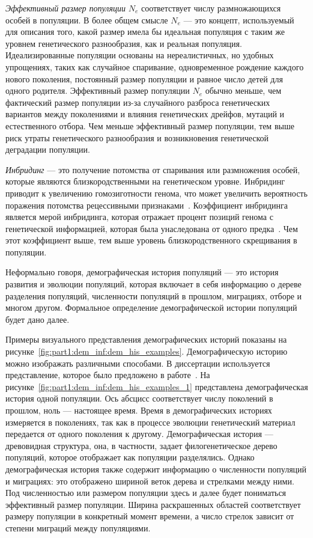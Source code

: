 \emph{Эффективный размер популяции} $N_e$ соответствует числу размножающихся особей в популяции. 
В более общем смысле $N_e$ --- это концепт, используемый для описания того, какой размер имела бы идеальная популяция с таким же уровнем генетического разнообразия, как и реальная популяция.
Идеализированные популяции основаны на нереалистичных, но удобных упрощениях, таких как случайное спаривание, одновременное рождение каждого нового поколения, постоянный размер популяции и равное число детей для одного родителя.
Эффективный размер популяции $N_e$ обычно меньше, чем фактический размер популяции из-за случайного разброса генетических вариантов между поколениями и влияния генетических дрейфов, мутаций и естественного отбора.
Чем меньше эффективный размер популяции, тем выше риск утраты генетического разнообразия и возникновения генетической деградации популяции.

\emph{Инбридинг} --- это получение потомства от спаривания или размножения особей, которые являются близкородственными на генетическом уровне.
Инбридинг приводит к увеличению гомозиготности генома, что может увеличить вероятность поражения потомства рецессивными признаками~\cite{nabulsi2003parental}.
Коэффициент инбридинга является мерой инбридинга, которая отражает  процент позиций генома с генетической информацией, которая была унаследована от одного предка~\cite{wright1922coefficients}.
Чем этот коэффициент выше, тем выше уровень близкородственного скрещивания в популяции.

Неформально говоря, демографическая история популяций --- это история развития и эволюции популяций, которая включает в себя информацию о дереве разделения популяций, численности популяций в прошлом, миграциях, отборе и многом другом.
Формальное определение демографической истории популяций будет дано далее.

Примеры визуального представления демографических историй показаны на рисунке~\ref{fig:part1:dem_inf:dem_his_examples}.
Демографическую историю можно изображать различными способами.
В диссертации используется представление, которое было предложено в работе~\cite{gower2022demes}.
На рисунке~\ref{fig:part1:dem_inf:dem_his_examples_1} представлена демографическая история одной популяции.
Ось абсцисс соответствует числу поколений в прошлом, ноль --- настоящее время.
Время в демографических историях измеряется в поколениях, так как в процессе эволюции генетический материал передается от одного поколения к другому.
Демографическая история --- древовидная структура, она, в частности, задает филогенетическое дерево популяций, которое отображает как популяции разделялись.
Однако демографическая история также содержит информацию о численности популяций и миграциях: это отображено шириной веток дерева и стрелками между ними.
Под численностью или размером популяции здесь и далее будет пониматься эффективный размер популяции.
Ширина раскрашенных областей соответствует размеру популяции в конкретный момент времени, а число стрелок зависит от степени миграций между популяциями.

